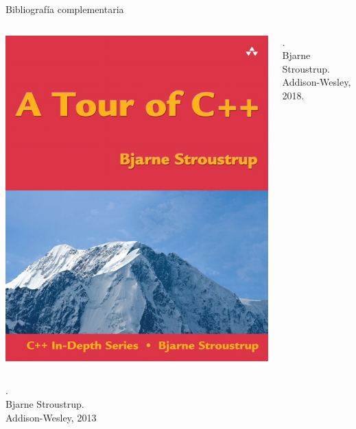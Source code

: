\begin{frame}[t]{Bibliografía complementaria}
\begin{columns}

\includegraphics[width=\linewidth]{images/tour.png}

.\\
Bjarne Stroustrup.\\
Addison-Wesley, 2018.

\end{columns}

\vfill

\begin{columns}


.\\
Bjarne Stroustrup.\\
Addison-Wesley, 2013


\end{columns}
\end{frame}

